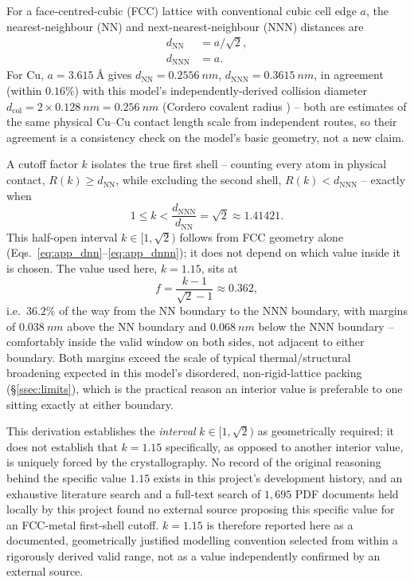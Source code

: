\documentclass[aip,amsmath,amssymb,reprint]{revtex4-1}
\begin{document}
For a face-centred-cubic (FCC) lattice with conventional cubic cell edge
$a$, the nearest-neighbour (NN) and next-nearest-neighbour (NNN)
distances are
\begin{align}
  d_{\mathrm{NN}}  &= a/\sqrt{2}, \label{eq:app_dnn}\\
  d_{\mathrm{NNN}} &= a. \label{eq:app_dnnn}
\end{align}
For Cu, $a=\SI{3.615}{\angstrom}$ \citep{straumanis1969} gives
$d_{\mathrm{NN}}=\SI{0.2556}{nm}$, $d_{\mathrm{NNN}}=\SI{0.3615}{nm}$, in
agreement (within $0.16\%$) with this model's independently-derived
collision diameter $d_{\mathrm{col}}=2\times\SI{0.128}{nm}=\SI{0.256}{nm}$
(Cordero covalent radius \citep{cordero2008}) -- both are estimates of
the same physical Cu--Cu contact length scale from independent routes,
so their agreement is a consistency check on the model's basic geometry,
not a new claim.

A cutoff factor $k$ isolates the true first shell -- counting every atom
in physical contact, $R(k)\ge d_{\mathrm{NN}}$, while excluding the
second shell, $R(k) < d_{\mathrm{NNN}}$ -- exactly when
\begin{equation}
  1 \le k < \frac{d_{\mathrm{NNN}}}{d_{\mathrm{NN}}} = \sqrt{2} \approx 1.41421.
  \label{eq:app_kwindow}
\end{equation}
This half-open interval $k\in[1,\sqrt{2})$ follows from FCC geometry
alone (Eqs.~\ref{eq:app_dnn}--\ref{eq:app_dnnn}); it does not depend on
which value inside it is chosen. The value used here, $k=1.15$, sits at
\begin{equation}
  f = \frac{k-1}{\sqrt{2}-1} \approx 0.362,
  \label{eq:app_kfrac}
\end{equation}
i.e.\ $36.2\%$ of the way from the NN boundary to the NNN boundary, with
margins of $\SI{0.038}{nm}$ above the NN boundary and $\SI{0.068}{nm}$
below the NNN boundary -- comfortably inside the valid window on both
sides, not adjacent to either boundary. Both margins exceed the scale of
typical thermal/structural broadening expected in this model's
disordered, non-rigid-lattice packing (\S\ref{ssec:limits}), which is
the practical reason an interior value is preferable to one sitting
exactly at either boundary.

This derivation establishes the \emph{interval} $k\in[1,\sqrt{2})$ as
geometrically required; it does not establish that $k=1.15$
specifically, as opposed to another interior value, is uniquely forced
by the crystallography. No record of the original reasoning behind the
specific value $1.15$ exists in this project's development history, and
an exhaustive literature search and a full-text search of $1{,}695$ PDF
documents held locally by this project found no external source
proposing this specific value for an FCC-metal first-shell cutoff.
$k=1.15$ is therefore reported here as a documented, geometrically
justified modelling convention selected from within a rigorously
derived valid range, not as a value independently confirmed by an
external source.
\end{document}
